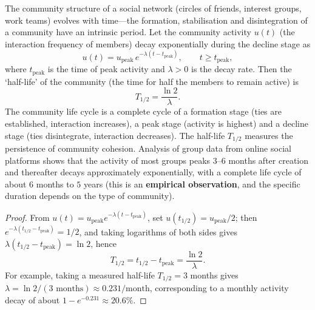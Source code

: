 \begin{proposition}\label{prop:community_cycle}
The community structure of a social network (circles of friends, interest groups, work teams) evolves with time---the formation, stabilisation and disintegration of a community have an intrinsic period. Let the community activity $u(t)$ (the interaction frequency of members) decay exponentially during the decline stage as
\[
u(t) = u_{\text{peak}}\, e^{-\lambda (t - t_{\text{peak}})}, \qquad t \ge t_{\text{peak}},
\]
where $t_{\text{peak}}$ is the time of peak activity and $\lambda > 0$ is the decay rate. Then the `half-life' of the community (the time for half the members to remain active) is
\[
T_{1/2} = \frac{\ln 2}{\lambda}.
\]
The community life cycle is a complete cycle of a formation stage (ties are established, interaction increases), a peak stage (activity is highest) and a decline stage (ties disintegrate, interaction decreases). The half-life $T_{1/2}$ measures the persistence of community cohesion. Analysis of group data from online social platforms shows that the activity of most groups peaks $3$--$6$ months after creation and thereafter decays approximately exponentially, with a complete life cycle of about $6$ months to $5$ years (this is an \textbf{empirical observation}, and the specific duration depends on the type of community).
\end{proposition}

\begin{proof}
From $u(t) = u_{\text{peak}} e^{-\lambda(t-t_{\text{peak}})}$, set $u(t_{1/2}) = u_{\text{peak}}/2$; then $e^{-\lambda(t_{1/2}-t_{\text{peak}})} = 1/2$, and taking logarithms of both sides gives $\lambda(t_{1/2}-t_{\text{peak}}) = \ln 2$, hence
\[
T_{1/2} = t_{1/2} - t_{\text{peak}} = \frac{\ln 2}{\lambda}.
\]
For example, taking a measured half-life $T_{1/2} = 3$ months gives $\lambda = \ln 2/(3\text{ months}) \approx 0.231/\text{month}$, corresponding to a monthly activity decay of about $1 - e^{-0.231} \approx 20.6\%$.
\end{proof}

